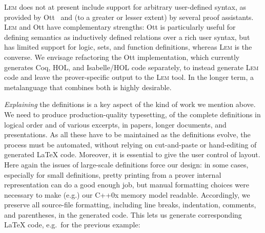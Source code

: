 \documentclass[a4paper]{llncs}
\newcommand{\myparagraph}[1]{\vspace{0.5\baselineskip}\par\noindent{\normalsize\bfseries{#1}}\quad}
\newcommand{\toolname}{\textsc{Lem}}
\begin{document}
\toolname{} does not at present include support for arbitrary
user-defined syntax, as provided by Ott~\cite{ott} and (to a greater or lesser
extent) by several proof assistants.  
%
\toolname{} and Ott have complementary strengths:  Ott is particularly
useful for defining semantics as inductively defined relations over a
rich user syntax, but has limited support for logic, sets, and
function definitions, whereas \toolname{} is the converse.  
We envisage refactoring the Ott implementation, which currently
generates
Coq, HOL, and Isabelle/HOL code separately, to instead generate
\toolname{} code and leave the prover-specific output to the \toolname{}
tool.  In the longer term, a metalanguage that combines both is highly desirable.





\myparagraph{2. Taking the source text seriously}
\emph{Explaining} the definitions is a key aspect of the kind of work we mention above.
%
We need to produce production-quality typesetting, of
the complete definitions in logical order and of various excerpts, in
papers, longer documents, and presentations.  As all these have to be
maintained as the definitions evolve, the process must be automated,
without relying on cut-and-paste or hand-editing of generated LaTeX
code.
%
Moreover, it is essential to give the user control of layout.
Here again the issues of large-scale definitions force our design: in
some cases, especially for small definitions, pretty printing from a
prover internal representation can do a good enough job, but manual formatting choices were necessary to make
(e.g.) our C++0x memory model readable. 
%
Accordingly, we preserve all
source-file formatting, including line breaks, indentation, comments, and parentheses,
in the generated code.  This lets us generate corresponding LaTeX code, e.g.~for the previous example:

\end{document}
